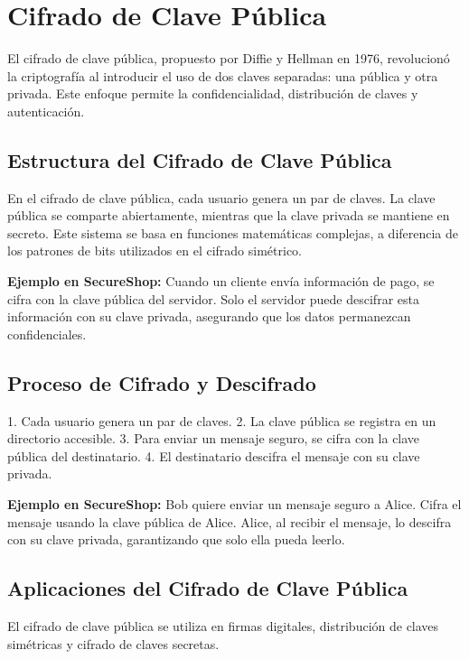 \section{Cifrado de Clave Pública}

El cifrado de clave pública, propuesto por Diffie y Hellman en 1976, revolucionó la criptografía al introducir el uso de dos claves separadas: una pública y otra privada. Este enfoque permite la confidencialidad, distribución de claves y autenticación.

\subsection{Estructura del Cifrado de Clave Pública}

En el cifrado de clave pública, cada usuario genera un par de claves. La clave pública se comparte abiertamente, mientras que la clave privada se mantiene en secreto. Este sistema se basa en funciones matemáticas complejas, a diferencia de los patrones de bits utilizados en el cifrado simétrico.

\textbf{Ejemplo en SecureShop:} Cuando un cliente envía información de pago, se cifra con la clave pública del servidor. Solo el servidor puede descifrar esta información con su clave privada, asegurando que los datos permanezcan confidenciales.

\subsection{Proceso de Cifrado y Descifrado}

1. Cada usuario genera un par de claves.
2. La clave pública se registra en un directorio accesible.
3. Para enviar un mensaje seguro, se cifra con la clave pública del destinatario.
4. El destinatario descifra el mensaje con su clave privada.

\textbf{Ejemplo en SecureShop:} Bob quiere enviar un mensaje seguro a Alice. Cifra el mensaje usando la clave pública de Alice. Alice, al recibir el mensaje, lo descifra con su clave privada, garantizando que solo ella pueda leerlo.

\subsection{Aplicaciones del Cifrado de Clave Pública}

El cifrado de clave pública se utiliza en firmas digitales, distribución de claves simétricas y cifrado de claves secretas.


